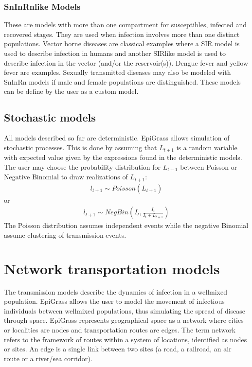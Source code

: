 \documentclass[letterpaper,10pt,english]{sphinxmanual}
\begin{document}
\subsubsection{SnInRn\sphinxhyphen{}like Models}
\label{\detokenize{intromodels:sninrn-like-models}}
These are models with more than one compartment for susceptibles,
infected and recovered stages. They are used when infection involves
more than one distinct populations. Vector borne diseases are
classical examples where a SIR model is used to describe infection in
humans and another SIR\sphinxhyphen{}like model is used to describe infection in the
vector (and/or the reservoir(s)). Dengue fever and yellow fever are
examples. Sexually transmitted diseases may also be modeled with
SnInRn models if male and female populations are distinguished. These
models can be define by the user as a custom model.


\subsection{Stochastic models}
\label{\detokenize{intromodels:stochastic-models}}
\ignorespaces 
All models described so far are deterministic. EpiGrass allows simulation of stochastic processes. This is done by assuming that \(L_{t+1}\) is a random variable with expected value given by the expressions found in the deterministic models. The user may choose the probability distribution for \(L_{t+1}\) between Poisson or Negative Binomial to draw realizations of \(L_{t+1}\):
\begin{equation*}
\begin{split}l_{t+1} \sim Poisson (L_{t+1})\end{split}
\end{equation*}
or
\begin{equation*}
\begin{split}l_{t+1} \sim NegBin (I_t, \frac{I_t}{I_t+L_{t+1}})\end{split}
\end{equation*}
The Poisson distribution assumes independent events while the negative Binomial assume clustering of transmission events.


\section{Network transportation models}
\label{\detokenize{intromodels:network-transportation-models}}
\ignorespaces 
The transmission models describe the dynamics of infection in a well\sphinxhyphen{}mixed population. EpiGrass allows the user to model the movement of infectious individuals between well\sphinxhyphen{}mixed populations, thus simulating the spread of disease through space. EpiGrass represents geographical space as a network where cities or localities are nodes and transportation routes are edges. The term network refers to the framework of routes within a system of locations, identified as nodes or sites. An edge is a single link between two sites (a road, a railroad, an air route or a river/sea corridor).
\end{document}
